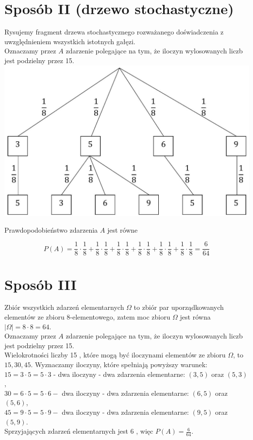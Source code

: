 \documentclass[10pt]{article}
\begin{document}
\section*{Sposób II (drzewo stochastyczne)}
Rysujemy fragment drzewa stochastycznego rozważanego doświadczenia z uwzględnieniem wszystkich istotnych gałęzi.\\
Oznaczamy przez $A$ zdarzenie polegające na tym, że iloczyn wylosowanych liczb jest podzielny przez 15.\\
\includegraphics[max width=\textwidth, center]{2025_02_07_83b95a6405af75d2626bg-30}

Prawdopodobieństwo zdarzenia $A$ jest równe

$$
P(A)=\frac{1}{8} \cdot \frac{1}{8}+\frac{1}{8} \cdot \frac{1}{8}+\frac{1}{8} \cdot \frac{1}{8}+\frac{1}{8} \cdot \frac{1}{8}+\frac{1}{8} \cdot \frac{1}{8}+\frac{1}{8} \cdot \frac{1}{8}=\frac{6}{64}
$$

\section*{Sposób III}
Zbiór wszystkich zdarzeń elementarnych $\Omega$ to zbiór par uporządkowanych elementów ze zbioru 8-elementowego, zatem moc zbioru $\Omega$ jest równa $|\Omega|=8 \cdot 8=64$.\\
Oznaczamy przez $A$ zdarzenie polegające na tym, że iloczyn wylosowanych liczb jest podzielny przez 15.\\
Wielokrotności liczby 15 , które mogą być iloczynami elementów ze zbioru $\Omega$, to $15,30,45$. Wyznaczamy iloczyny, które spełniają powyższy warunek:\\
$15=3 \cdot 5=5 \cdot 3$ - dwa iloczyny - dwa zdarzenia elementarne: $(3,5)$ oraz $(5,3)$,\\
$30=6 \cdot 5=5 \cdot 6-$ dwa iloczyny - dwa zdarzenia elementarne: $(6,5)$ oraz $(5,6)$,\\
$45=9 \cdot 5=5 \cdot 9-$ dwa iloczyny - dwa zdarzenia elementarne: $(9,5)$ oraz $(5,9)$.\\
Sprzyjających zdarzeń elementarnych jest 6 , więc $P(A)=\frac{6}{64}$.
\end{document}
